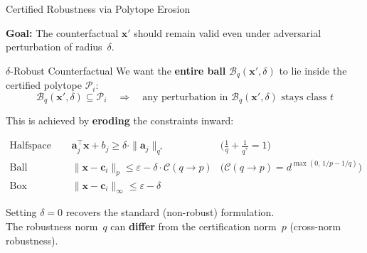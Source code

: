 \documentclass[aspectratio=169, 10pt]{beamer}
\newcommand{\vx}{\mathbf{x}}
\newcommand{\va}{\mathbf{a}}
\newcommand{\vc}{\mathbf{c}}
\newcommand{\Bq}{\mathcal{B}_q}
\newcommand{\PP}{\mathcal{P}}
\begin{document}
\begin{frame}{Certified Robustness via Polytope Erosion}

\textbf{Goal:} The counterfactual $\vx'$ should remain valid even under adversarial perturbation of radius~$\delta$.

\begin{block}{$\delta$-Robust Counterfactual}
We want the \textbf{entire ball} $\Bq(\vx', \delta)$ to lie inside the certified polytope $\PP_i$:
\[
  \Bq(\vx', \delta) \subseteq \PP_i \quad\Longrightarrow\quad \text{any perturbation in } \Bq(\vx', \delta) \text{ stays class } t
\]
\end{block}

\medskip

This is achieved by \textbf{eroding} the constraints inward:

\begin{align*}
  \text{Halfspace erosion:}\quad & \va_j^\top \vx + b_j \geq \delta \cdot \|\va_j\|_{q^*}
    & \bigl(\tfrac{1}{q}+\tfrac{1}{q^*}=1\bigr) \\[4pt]
  \text{Ball shrinkage:}\quad & \|\vx - \vc_i\|_p \leq \varepsilon - \delta \cdot \mathcal{C}(q \!\to\! p)
    & \bigl(\mathcal{C}(q\!\to\! p) = d^{\max(0,\,1/p - 1/q)}\bigr) \\[4pt]
  \text{Box shrinkage:}\quad & \|\vx - \vc_i\|_\infty \leq \varepsilon - \delta
\end{align*}

\medskip

Setting $\delta = 0$ recovers the standard (non-robust) formulation.\\
The robustness norm~$q$ can \textbf{differ} from the certification norm~$p$ (cross-norm robustness).

\end{frame}
\end{document}
